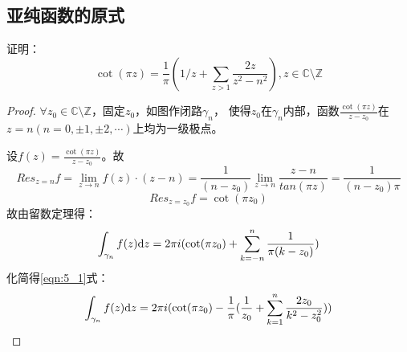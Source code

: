 \subsection{亚纯函数的原式}
\begin{eg}
	\color{blue}证明：
	\begin{equation*}
	\cot (\pi z)=\frac{1}{\pi} (1/z+\sum\limits_{z>1}\frac{2z}{z^2-n^2}),z\in \mathbb{C}\setminus \mathbb{Z}
	\end{equation*}
\end{eg}
\begin{proof}
	$\forall z_0\in \mathbb{C}\setminus \mathbb{Z}$，固定$z_0$，如图作闭路$\gamma_n$，
	使得$z_0$在$\gamma_n$内部，函数$\frac{\cot (\pi z)}{z-z_0}$在$z=n(n=0,\pm 1,\pm 2, \cdots)$上均为一级极点。\par 设$f(z)=\frac{\cot (\pi z)}{z-z_0}$。故
	\begin{equation*}
	Res_{z=n}f=\lim\limits_{z\to n}f(z)\cdot (z-n)=\frac{1}{(n-z_0)} \lim\limits_{z\to n}\frac{z-n}{tan(\pi z)}=\frac{1}{(n-z_0)\pi}
	\end{equation*}
	\begin{equation*}
	Res_{z=z_0}f=\cot (\pi z_0)
	\end{equation*}
	故由留数定理得：
	\begin{equation*}
	\int_{\gamma_n}{f(z)\mathrm{d}z}=2\pi i(\cot (\pi z_0)+\sum\limits_{k=-n}^n{\frac{1}{\pi (k-z_0)}})
	\end{equation*}
	化简得\eqref{eqn:5_1}式：
	\begin{equation}
	\int_{\gamma_n}{f(z)\mathrm{d}z}=2\pi i(\cot (\pi z_0)-\frac{1}{\pi} (\frac{1}{z_0}+\sum\limits_{k=1}^n{\frac{2z_0}{k^2-z_0^2}}))\label{eqn:5_1}
	\end{equation}
	

\end{proof}
